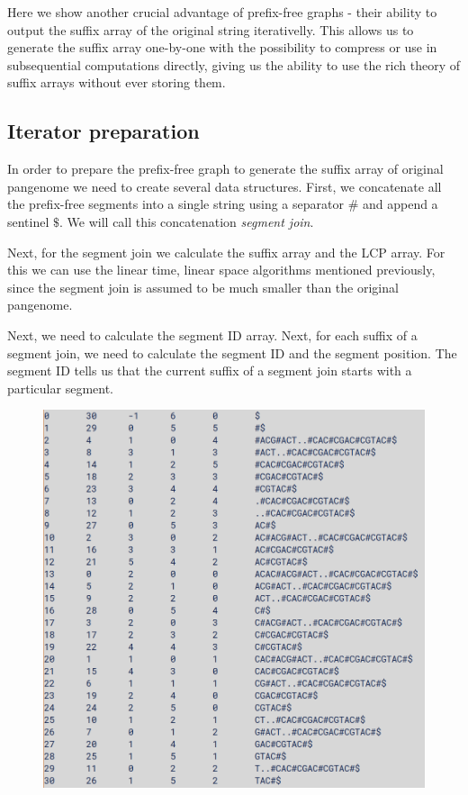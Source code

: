 \documentclass[twocolumn]{ceurart}
\begin{document}
Here we show another crucial advantage of prefix-free graphs - their ability to
output the suffix array of the original string iterativelly.
This allows us to generate the suffix array one-by-one with the possibility
to compress or use in subsequential computations directly, giving us the ability
to use the rich theory of suffix arrays without ever storing them.

\subsection{Iterator preparation}
In order to prepare the prefix-free graph to generate the suffix array of
original pangenome we need to create several data structures.
First, we concatenate all the prefix-free segments into a single string using
a separator $\#$ and append a sentinel $\$$.
We will call this concatenation \emph{segment join}.

Next, for the segment join we calculate the suffix array and the LCP array.
For this we can use the linear time, linear space algorithms mentioned previously,
since the segment join is assumed to be much smaller than the original pangenome.

Next, we need to calculate the segment ID array.
Next, for each suffix of a segment join, we need to calculate the segment ID
and the segment position.
The segment ID tells us that the current suffix of a segment join starts with a particular segment.

\begin{figure}
    \centering
    \includegraphics[width=\linewidth]{images/segment_table.png}
    \caption{}
    \label{fig:segment_sa}
\end{figure}
\end{document}
